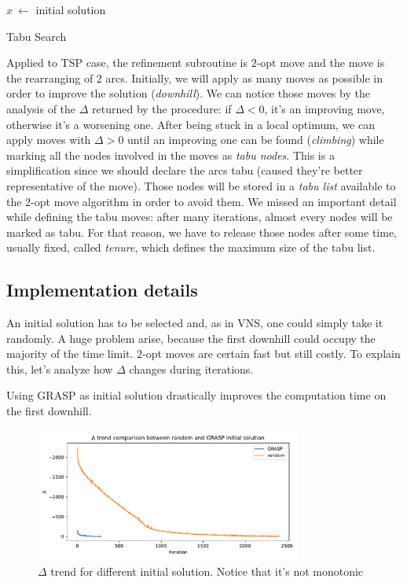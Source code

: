 \begin{algorithm}[H]
\SetAlgoLined
{}
    $x\ \leftarrow$ initial solution\;
    \caption{Tabu Search}
\end{algorithm}

Applied to TSP case, the refinement subroutine is $2$-opt move and the move is
the rearranging of 2 arcs. Initially, we will apply as many moves as possible in
order to improve the solution (\emph{downhill}). We can notice those moves by the
analysis of the $\Delta$ returned by the procedure: if $\Delta < 0$, it's an
improving move, otherwise it's a worsening one. After being stuck in a local
optimum, we can apply moves with $\Delta > 0$ until an improving one can be
found (\emph{climbing}) while marking all the nodes involved in the moves as
\emph{tabu nodes}. This is a simplification since we should declare the arcs
tabu (caused they're better representative of the move). Those nodes will be
stored in a \emph{tabu list} available to the $2$-opt move algorithm in order to
avoid them. We missed an important detail while defining the tabu moves: after
many iterations, almost every nodes will be marked as tabu. For that reason, we
have to release those nodes after some time, usually fixed, called
\emph{tenure}, which defines the maximum size of the tabu list. 

\subsection{Implementation details}
An initial solution has to be selected and, as in VNS, one could simply take it
randomly. A huge problem arise, because the first downhill could occupy the
majority of the time limit. $2$-opt moves are certain fast but still costly. To
explain this, let's analyze how $\Delta$ changes during iterations.

\begin{claim}
    Using GRASP as initial solution drastically improves the computation time on
    the first downhill.
\end{claim}

\begin{figure}[h!]
    \centering
    \includegraphics[width=0.78\textwidth]{figures/delta_trend}
    \caption[$\Delta$ trend for different initial solution]{\centering $\Delta$ trend for
    different initial solution. Notice that it's not monotonic}
\end{figure}

